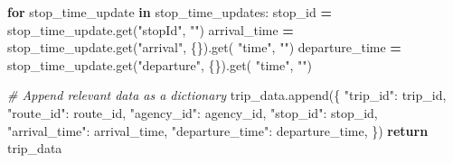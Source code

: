 \documentclass[
  12pt,
]{article}
\newenvironment{Shaded}{\begin{snugshade}}{\end{snugshade}}
\newcommand{\CommentTok}[1]{\textcolor[rgb]{0.56,0.35,0.01}{\textit{#1}}}
\newcommand{\ControlFlowTok}[1]{\textcolor[rgb]{0.13,0.29,0.53}{\textbf{#1}}}
\newcommand{\KeywordTok}[1]{\textcolor[rgb]{0.13,0.29,0.53}{\textbf{#1}}}
\newcommand{\NormalTok}[1]{#1}
\newcommand{\OperatorTok}[1]{\textcolor[rgb]{0.81,0.36,0.00}{\textbf{#1}}}
\newcommand{\StringTok}[1]{\textcolor[rgb]{0.31,0.60,0.02}{#1}}
\begin{document}
\begin{Shaded}
\begin{Highlighting}[]
            \ControlFlowTok{for}\NormalTok{ stop\_time\_update }\KeywordTok{in}\NormalTok{ stop\_time\_updates:}
\NormalTok{                stop\_id }\OperatorTok{=}\NormalTok{ stop\_time\_update.get(}\StringTok{"stopId"}\NormalTok{, }\StringTok{""}\NormalTok{)}
\NormalTok{                arrival\_time }\OperatorTok{=}\NormalTok{ stop\_time\_update.get(}\StringTok{"arrival"}\NormalTok{, \{\}).get(}
                  \StringTok{"time"}\NormalTok{, }\StringTok{""}\NormalTok{)}
\NormalTok{                departure\_time }\OperatorTok{=}\NormalTok{ stop\_time\_update.get(}\StringTok{"departure"}\NormalTok{, \{\}).get(}
                  \StringTok{"time"}\NormalTok{, }\StringTok{""}\NormalTok{)}
                
                \CommentTok{\# Append relevant data as a dictionary}
\NormalTok{                trip\_data.append(\{}
                    \StringTok{"trip\_id"}\NormalTok{: trip\_id,}
                    \StringTok{"route\_id"}\NormalTok{: route\_id,}
                    \StringTok{"agency\_id"}\NormalTok{: agency\_id,}
                    \StringTok{"stop\_id"}\NormalTok{: stop\_id,}
                    \StringTok{"arrival\_time"}\NormalTok{: arrival\_time,}
                    \StringTok{"departure\_time"}\NormalTok{: departure\_time,}
\NormalTok{                \})}
    \ControlFlowTok{return}\NormalTok{ trip\_data}
\end{Highlighting}
\end{Shaded}
\end{document}
